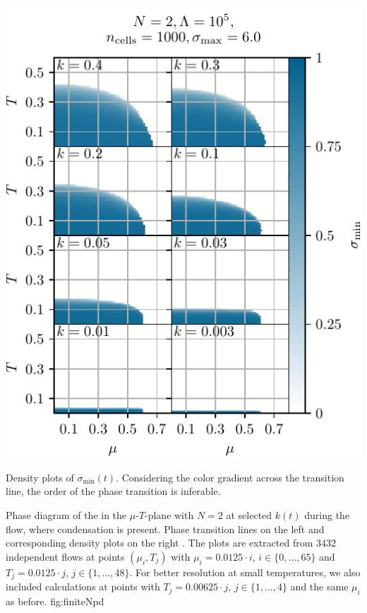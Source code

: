 	{%
		\includegraphics[width=\subcaptionFigureWidth]{gn/figures/phase_diagram.pdf}%
		\captionsetup{font=footnotesize,width=\subcaptionFigureWidth}%
		\caption{
			Density plots of $\sigma_\mathrm{min}(t)$.
			Considering the color gradient across the transition line, the order of the phase transition is inferable.
		}%
		\label{fig:phase_diagram}%
	}
	{%
		Phase diagram of the \gnym{} in the $\mu$-$T$-plane with $N = 2$ at selected \rgscales{} $k ( t )$ during the \frg{} flow, where condensation is present. 
		Phase transition lines on the left  and corresponding density plots on the right .
		The plots are extracted from $3432$ independent \frg{} flows at points $( \mu_i, T_j )$ with $\mu_i = 0.0125 \cdot i$, $i \in \{ 0, \ldots, 65 \}$ and $T_j = 0.0125 \cdot j$, $j \in \{ 1, \ldots, 48 \}$. For better resolution at small temperatures, we also included calculations at points with $T_j = 0.00625 \cdot j$, $j \in \{ 1, \ldots, 4 \}$ and the same $\mu_i$ as before.
	}%
	{fig:finiteNpd}%
	
